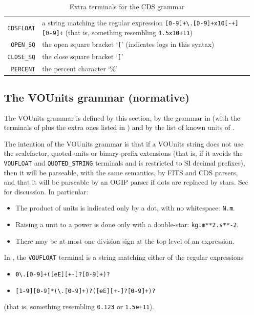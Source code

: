 \documentclass[11pt,notitlepage,onecolumn]{ivoa}
\begin{document}
\begin{table}[ht]
\begin{tabular}{rL{10cm}}
\texttt{CDSFLOAT}&a string matching the regular
expression \texttt{[0-9]+\textbackslash.[0-9]+x10[-+][0-9]+}
(that is, something resembling \texttt{1.5x10+11})\\
\texttt{OPEN\_SQ}&the open square bracket `\texttt{[}' (indicates logs
  in this syntax)\\
\texttt{CLOSE\_SQ}&the close square bracket `\texttt{]}'\\
\texttt{PERCENT}&the percent character `\%'
\end{tabular}
\caption[Extra CDS terminals]{\label{tabx:cdsterminals}Extra terminals
for the CDS grammar}
\end{table}




\subsection{The VOUnits grammar (normative)}
\label{appx:vougrammar}

The VOUnits grammar is defined by this section, by the grammar in
(with the terminals of 
plus the extra ones listed in )
and by the list of known units of .

The intention of the VOUnits grammar is that if a VOUnits string
does not use the scalefactor, quoted-units or binary-prefix
extensions
(that is, if it avoids the \texttt{VOUFLOAT}
and \texttt{QUOTED\_STRING} terminals and is restricted to SI decimal prefixes),
then it will be parseable, with the same semantics, by FITS
and CDS parsers, and that it will be parseable by an OGIP parser if
dots are replaced by stars.
See  for discussion.
In particular:
\begin{itemize}
\item The product of units is indicated only by a dot, with no
  whitespace: \texttt{N.m}.
\item Raising a unit to a power is done only with a double-star:
  \texttt{kg.m**2.s**-2}.
\item There may be at most one division sign at the top level of an
  expression.
\end{itemize}

In , the \texttt{VOUFLOAT} terminal is a
string matching either of the regular expressions
\begin{itemize}
\item\texttt{0\textbackslash.[0-9]+([eE][+-]?[0-9]+)?}
\item\texttt{[1-9][0-9]*(\textbackslash.[0-9]+)?([eE][+-]?[0-9]+)?}
\end{itemize}
(that is, something resembling \texttt{0.123} or \texttt{1.5e+11}).
\end{document}
